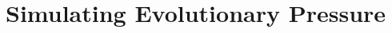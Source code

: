 \documentclass[12pt]{article}	%
\begin{document}
\section{Simulating Evolutionary Pressure}\label{sup_algorithmic_workflow}


\end{document}
